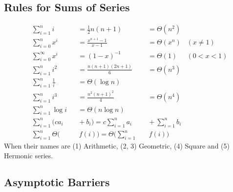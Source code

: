 \documentclass[]{article}
\newcommand\logn  {\log n}
\begin{document}
\begin{multicols}{2}
		\subsection{Rules for Sums of Series}
		\begin{alignat}{9}
			&\sum_{i = 1}^n i &&= \tfrac{1}{2}n(n + 1) &&= \Theta(n^2) \\
			&\sum_{i = 0}^{n} x^i &&= \tfrac{x^{n + 1} - 1}{x - 1} &&= \Theta(x^n)  &(x \neq 1) \\
			&\sum_{i = 0}^{\infty} x^i&&= (1 - x)^{-1} &&= \Theta(1) &(0 < x < 1) \\
			&\sum_{i = 1}^{n} i^2 &&= \tfrac{n(n + 1)(2n + 1)}{6} &&= \Theta(n^3) \\
			&\sum_{i = 1}^{n} \tfrac{1}{i} &&= \Theta(\logn) \\
			&\sum_{i = 1}^{n} i^3 &&= \tfrac{n^2(n + 1)^2}{4} &&= \Theta(n^4) \\
			&\sum_{i = 1}^{n}  \log i &&= \Theta(n\log n) \\
			&\sum_{i = 1}^n (ca_i &&\!\!+ b_i) = c \sum_{i = 1}^{n} a_i &&\!\!+ \sum_{i = 1}^{n}b_i \\
			&\sum_{i = 1}^{n} \Theta \big(&&\!\!\!\!\, f(i)\big) = \Theta \Bigg (\sum_{i = 1}^{n} &&\!\!\!\, f(i) \Bigg)
		\end{alignat}
		When their names are (1) Arithmetic, (2, 3) Geometric, (4) Square and (5) Hermonic series.
		
		\subsection{Asymptotic Barriers}

\end{multicols}
\end{document}
